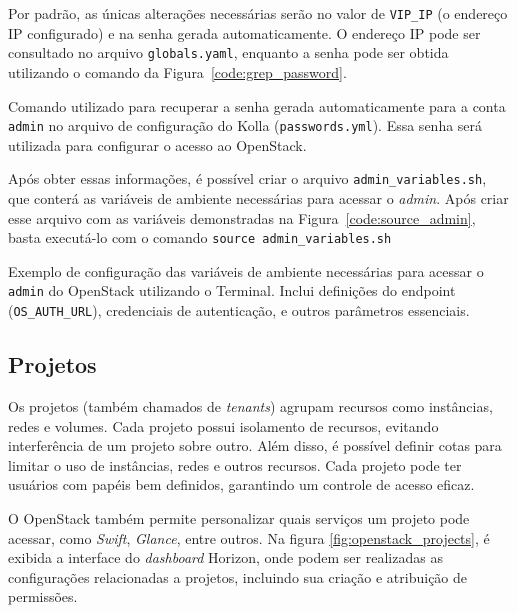 Por padrão, as únicas alterações necessárias serão no valor de \texttt{VIP\_IP} (o endereço IP configurado) e na senha gerada automaticamente. O endereço IP pode ser consultado no arquivo \texttt{globals.yaml}, enquanto a senha pode ser obtida utilizando o comando da Figura~\ref{code:grep_password}.

\begin{listing}[h!]
    \noindent{}  
  \caption{Comando utilizado para recuperar a senha gerada automaticamente para a conta \texttt{admin} no arquivo de configuração do Kolla (\texttt{passwords.yml}). Essa senha será utilizada para configurar o acesso ao OpenStack.}
  \label{code:grep_password}
\end{listing}

Após obter essas informações, é possível criar o arquivo \texttt{admin\_variables.sh}, que conterá as variáveis de ambiente necessárias para acessar o \textit{admin}. Após criar esse arquivo com as variáveis demonstradas na Figura~\ref{code:source_admin}, basta executá-lo com o comando \texttt{source admin\_variables.sh}

\begin{listing}[h!]
    \noindent{}  
  \caption{Exemplo de configuração das variáveis de ambiente necessárias para acessar o \texttt{admin} do OpenStack utilizando o Terminal. Inclui definições do endpoint (\texttt{OS\_AUTH\_URL}), credenciais de autenticação, e outros parâmetros essenciais.}
  \label{code:source_admin}
\end{listing}

\subsection{Projetos}
Os projetos (também chamados de \textit{tenants}) agrupam recursos como instâncias, redes e volumes. Cada projeto possui isolamento de recursos, evitando interferência de um projeto sobre outro. Além disso, é possível definir cotas para limitar o uso de instâncias, redes e outros recursos. Cada projeto pode ter usuários com papéis bem definidos, garantindo um controle de acesso eficaz.

O OpenStack também permite personalizar quais serviços um projeto pode acessar, como \textit{Swift}, \textit{Glance}, entre outros. Na figura \ref{fig:openstack_projects}, é exibida a interface do \textit{dashboard} Horizon, onde podem ser realizadas as configurações relacionadas a projetos, incluindo sua criação e atribuição de permissões.

